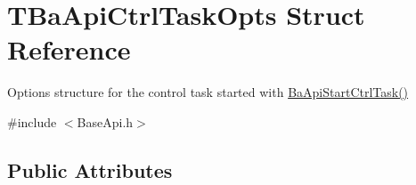 \hypertarget{structTBaApiCtrlTaskOpts}{}\section{T\+Ba\+Api\+Ctrl\+Task\+Opts Struct Reference}
\label{structTBaApiCtrlTaskOpts}


Options structure for the control task started with \hyperlink{BaseApi_8h_a60c99fae43923e540eaafa66bfe17508}{Ba\+Api\+Start\+Ctrl\+Task()}  




{\ttfamily \#include $<$Base\+Api.\+h$>$}

\subsection*{Public Attributes}

